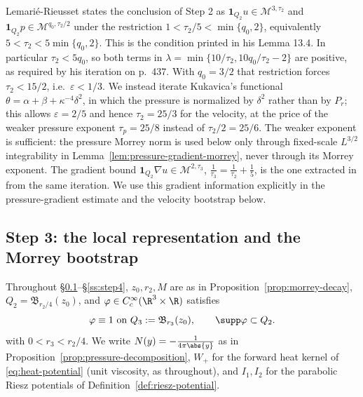 \documentclass[11pt,reqno]{amsart}
\begin{document}
\begin{remark}
\label{rem:LR-pressure}
Lemarié-Rieusset states the conclusion of Step 2 as
$\mathbf{1}_{Q_{2}}u\in\mathcal{M}^{3,\tau_{2}}$ and
$\mathbf{1}_{Q_{2}}p\in\mathcal{M}^{q_{0},\tau_{2}/2}$ under the restriction
$1<\tau_{2}/5<\min\{q_{0},2\}$, equivalently
$5<\tau_{2}<5\min\{q_{0},2\}$. This is the condition printed in his
Lemma 13.4. In particular $\tau_2<5q_0$, so both terms in
$\lambda=\min\{10/\tau_{2},10q_{0}/\tau_{2}-2\}$ are positive,
as required by his iteration on p.~437. With $q_{0}=3/2$
that restriction forces $\tau_{2}<15/2$, i.e.\ $\varepsilon<1/3$. We instead
iterate Kukavica's functional $\theta=\alpha+\beta+\kappa^{-4}\delta^{2}$, in
which the pressure is normalized by $\delta^{2}$ rather than by $P_{r}$; this
allows $\varepsilon=2/5$ and hence $\tau_{2}=25/3$ for the velocity, at the
price of the weaker pressure exponent $\tau_{p}=25/8$ instead of
$\tau_{2}/2=25/6$. The weaker exponent is sufficient: the pressure Morrey norm
is used below only through fixed-scale $L^{3/2}$ integrability in
Lemma~\ref{lem:pressure-gradient-morrey}, never through its Morrey exponent. The gradient bound
$\mathbf{1}_{Q_{2}}\nabla u\in\mathcal{M}^{2,\tau_{3}}$,
$\tfrac1{\tau_{3}}=\tfrac1{\tau_{2}}+\tfrac15$, is the one extracted in
\cite[p.~439]{LemarieRieusset2016} from the same iteration. We use this
gradient information explicitly in the pressure-gradient estimate and the
velocity bootstrap below.
\end{remark}

\subsection{Step 3: the local representation and the Morrey bootstrap}\label{ss:step3}

Throughout \S\ref{ss:step3}--\S\ref{ss:step4}, $z_{0},r_{2},M$ are as in
Proposition~\ref{prop:morrey-decay}, $Q_{2}=\mathfrak{B}_{r_{2}/4}(z_{0})$, and
$\varphi\in C_{c}^{\infty}(\R^{3}\times\R)$ satisfies
\begin{equation}\label{eq:phi-zeta}
  \varphi\equiv1\text{ on }Q_{3}:=\mathfrak{B}_{r_{3}}(z_{0}),
  \qquad
  \supp\varphi\subset Q_{2}.
\end{equation}
with $0<r_{3}<r_{2}/4$. We write $N(y)=-\tfrac1{4\pi\abs{y}}$ as in
Proposition~\ref{prop:pressure-decomposition}, $W_{+}$ for the forward heat
kernel of \eqref{eq:heat-potential} (unit viscosity, as throughout), and
$I_{1},I_{2}$ for the parabolic Riesz potentials of
Definition~\ref{def:riesz-potential}.
\end{document}

